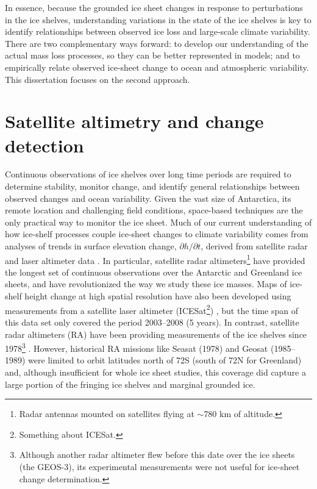 In essence, because the grounded ice sheet changes in response to perturbations in the ice
shelves, understanding variations in the state of the ice shelves is key to
identify relationships between observed ice loss and large-scale climate variability.
There are two complementary ways forward: to develop our understanding of the actual mass
loss processes, so they can be better represented in models; and to empirically relate observed
ice-sheet change to ocean and atmospheric variability. This dissertation focuses on the second
approach.

\section*{Satellite altimetry and change detection}

Continuous observations of ice shelves over long time periods are required to determine stability,
monitor change, and identify general relationships between observed changes and ocean
variability. Given the vast size of Antarctica, its remote location and challenging field conditions,
space-based techniques are the only practical way to monitor the ice sheet.
Much of our current understanding of how ice-shelf processes couple ice-sheet changes to climate variability comes from analyses of trends in surface elevation change, $\partial h / \partial t$, derived from satellite radar and laser altimeter data \parencite{Zwally2005, Shepherd2010, Pritchard2012, Fricker2012}.
In particular, satellite radar altimeters\footnote{Radar antennas mounted on satellites flying at
$\sim$780 km of altitude.}
have provided the longest set of continuous observations over the Antarctic and Greenland ice sheets, and have revolutionized the way we study these ice masses. Maps of ice-shelf height change at high spatial resolution have also been developed using measurements from a satellite laser altimeter (ICESat\footnote{Something about ICESat.}) \parencite{Pritchard2012}, but the time span of this data set only covered the period 2003--2008 (5 years). In contrast, satellite radar altimeters (RA) have been providing
measurements of the ice shelves since 1978\footnote{Although another radar altimeter flew before
this date over the ice sheets (the GEOS-3), its experimental measurements were not
useful for ice-sheet change determination.} \parencite{Zwally1983, Zwally1989, Davis1998, Martin1983}. However,
historical RA missions like Seasat (1978) and Geosat (1985--1989) were limited to orbit latitudes north of 72\degree S (south of 72\degree N for Greenland) and, although insufficient for whole ice sheet studies, this coverage did capture a large portion of the fringing ice shelves and marginal grounded ice.

